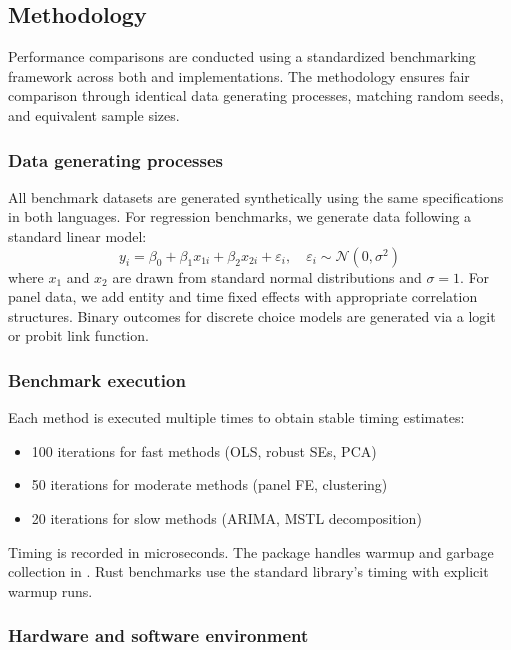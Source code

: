 \documentclass[article]{jss}
\begin{document}
\subsection{Methodology} \label{sec:benchmark-methodology}

Performance comparisons are conducted using a standardized benchmarking
framework across both  and  implementations.
The methodology ensures fair comparison through identical data generating
processes, matching random seeds, and equivalent sample sizes.

\subsubsection{Data generating processes}

All benchmark datasets are generated synthetically using the same specifications
in both languages. For regression benchmarks, we generate data following a
standard linear model:
\begin{equation}
  y_i = \beta_0 + \beta_1 x_{1i} + \beta_2 x_{2i} + \varepsilon_i, \quad
  \varepsilon_i \sim \mathcal{N}(0, \sigma^2)
\end{equation}
where $x_1$ and $x_2$ are drawn from standard normal distributions and
$\sigma = 1$. For panel data, we add entity and time fixed effects with
appropriate correlation structures. Binary outcomes for discrete choice
models are generated via a logit or probit link function.

\subsubsection{Benchmark execution}

Each method is executed multiple times to obtain stable timing estimates:
\begin{itemize}
  \item 100 iterations for fast methods (OLS, robust SEs, PCA)
  \item 50 iterations for moderate methods (panel FE, clustering)
  \item 20 iterations for slow methods (ARIMA, MSTL decomposition)
\end{itemize}
Timing is recorded in microseconds. The  package
\citep{microbenchmark} handles warmup and garbage collection in .
Rust benchmarks use the standard library's  timing with
explicit warmup runs.

\subsubsection{Hardware and software environment}
\end{document}
